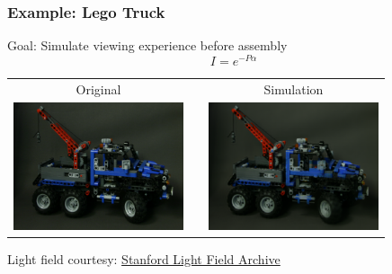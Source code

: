 \documentclass[12pt, compress]{beamer}
\begin{document}
\begin{frame}[fragile]
	\frametitle{Example: Lego Truck}
	
	Goal: Simulate viewing experience before assembly
	\begin{equation*}
		I = e^{- P \alpha}
	\end{equation*}
	
	\begin{center}
		\begin{tabular}{c p{0cm} c}
			Original & & Simulation \\
			\includegraphics[width = 5cm]{images/layers_and_projections/legotruck/original/08_08}
			& & \includegraphics[width = 5cm]{images/layers_and_projections/legotruck/Reconstruction_of_view_(3,3)}
		\end{tabular}
	\end{center}
	{\scriptsize Light field courtesy: \href{http://lightfield.stanford.edu/lfs.html}{Stanford Light Field Archive}}

\end{frame}
\end{document}
